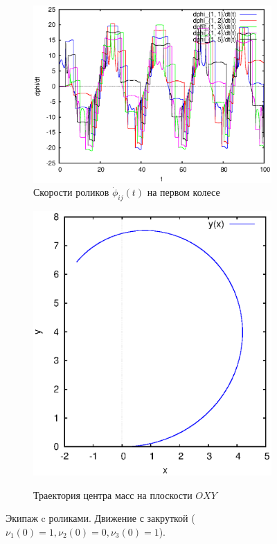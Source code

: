 \begin{figure}
    \begin{subfigure}[t]{0.45\textwidth}
        \centering
        \includegraphics[width=\linewidth]{pic/rol__wrench__velocities_of_rollers_of_wheel_1}
        \caption{Скорости роликов $\dot{\phi}_{ij}(t)$ на первом колесе}
        \label{fig:rol__wrench__velocities_of_rollers_of_wheel_1}    
    \end{subfigure}
    \hfill
    \begin{subfigure}[t]{0.45\textwidth}
        \centering
        \includegraphics[width=\linewidth]{pic/rol__wrench__trajectory} \\
        \caption{Траектория центра масс на плоскости $OXY$}
        \label{fig:rol__wrench__trajectory}
    \end{subfigure}
    
    \caption{Экипаж c роликами. Движение с закруткой ($\nu_1(0) = 1, \nu_2(0) = 0, \nu_3(0) = 1$).}
    \label{fig:wrench}
    
\end{figure}
